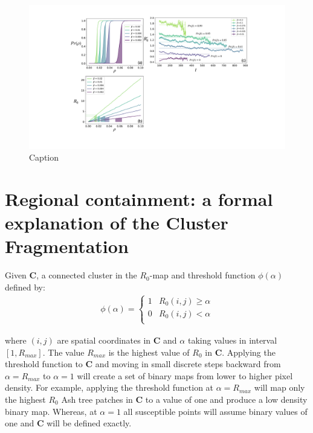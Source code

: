 \begin{figure}
    \centering
    \includegraphics[scale=0.35]{appendix/figures/app1.pdf}
    \caption{Caption}
    \label{fig:my_label}
\end{figure}

\blindtext


\chapter{Regional containment: a formal explanation of the Cluster Fragmentation}
\label{section:alpha-step}
Given $\mathbf{C}$, a connected cluster in the $R_0$-map and threshold function $\phi(\alpha)$ defined by:
\begin{align}
\label{eq:alpha-step}
\phi(\alpha) = \left\{ \begin{array}{cc} 
                1 & R_0(i, j) \geq \alpha \\
                0 & R_0(i, j) < \alpha \\
                \end{array} \right.
\end{align}

where $(i,j)$ are spatial coordinates in $\mathbf{C}$ and $\alpha$ taking values in interval $[1, R_{max}]$. The value $R_{max}$ is the highest value of $R_0$ in $\mathbf{C}$. Applying the threshold function to $\mathbf{C}$ and moving in small discrete steps backward from $\alpha = R_{max}$ to $\alpha=1$ will create a set of binary maps from lower to higher pixel density. For example, applying the threshold function at $\alpha = R_{max}$ will map only the highest $R_0$ Ash tree patches in $\mathbf{C}$ to a value of one and produce a low density binary map. Whereas, at $\alpha=1$ all susceptible points will assume binary values of one and $\mathbf{C}$ will be defined exactly.\\

